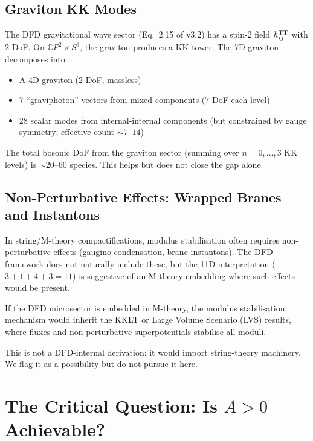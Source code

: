 \documentclass[11pt,a4paper]{article}
\newcommand{\CP}{\mathbb{C}P}
\begin{document}
\subsection{Graviton KK Modes}

The DFD gravitational wave sector (Eq.~2.15 of v3.2) has a spin-2
field $h_{ij}^{\rm TT}$ with 2 DoF. On $\CP^2 \times S^3$, the
graviton produces a KK tower. The 7D graviton decomposes into:
\begin{itemize}
\item A 4D graviton (2 DoF, massless)
\item 7 ``graviphoton'' vectors from mixed components (7 DoF each
  level)
\item 28 scalar modes from internal-internal components (but
  constrained by gauge symmetry; effective count $\sim 7$--$14$)
\end{itemize}

The total bosonic DoF from the graviton sector (summing over
$n = 0,\ldots,3$ KK levels) is $\sim 20$--$60$ species. This
helps but does not close the gap alone.

\subsection{Non-Perturbative Effects: Wrapped Branes and Instantons}

In string/M-theory compactifications, modulus stabilisation often
requires non-perturbative effects (gaugino condensation, brane
instantons). The DFD framework does not naturally include these,
but the 11D interpretation ($3+1 + 4 + 3 = 11$) is suggestive
of an M-theory embedding where such effects would be present.

If the DFD microsector is embedded in M-theory, the modulus
stabilisation mechanism would inherit the KKLT or Large Volume
Scenario (LVS) results, where fluxes and non-perturbative
superpotentials stabilise all moduli.

This is not a DFD-internal derivation: it would import
string-theory machinery. We flag it as a possibility but do not
pursue it here.


\section{The Critical Question: Is $A > 0$ Achievable?}
\label{sec:critical}
\end{document}
